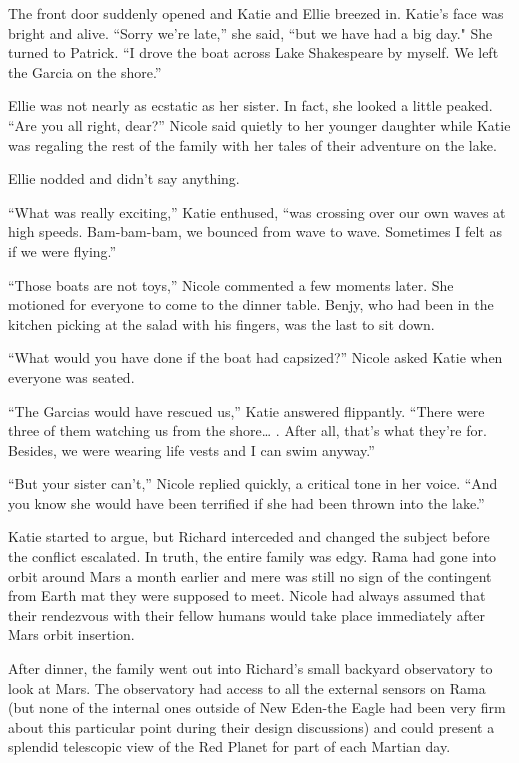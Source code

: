 \documentclass[]{article}
\begin{document}
{The front door suddenly opened and Katie and Ellie breezed in.  Katie’s face was bright and alive.  “Sorry we’re late,” she said, “but we have had a big day."  She turned to Patrick.  “I drove the boat across Lake Shakespeare by myself.  We left the Garcia on the shore.”

Ellie was not nearly as ecstatic as her sister.  In fact, she looked a little peaked.  “Are you all right, dear?” Nicole said quietly to her younger daughter while Katie was regaling the rest of the family with her tales of their adventure on the lake.

Ellie nodded and didn’t say anything.

“What was really exciting,” Katie enthused, “was crossing over our own waves at high speeds.  Bam-bam-bam, we bounced from wave to wave.  Sometimes I felt as if we were flying.”

“Those boats are not toys,” Nicole commented a few moments later.  She motioned for everyone to come to the dinner table.  Benjy, who had been in the kitchen picking at the salad with his fingers, was the last to sit down.

“What would you have done if the boat had capsized?” Nicole asked Katie when everyone was seated.

“The Garcias would have rescued us,” Katie answered flippantly.  “There were three of them watching us from the shore… .  After all, that’s what they’re for.  Besides, we were wearing life vests and I can swim anyway.”

“But your sister can’t,” Nicole replied quickly, a critical tone in her voice.  “And you know she would have been terrified if she had been thrown into the lake.”

Katie started to argue, but Richard interceded and changed the subject before the conflict escalated.  In truth, the entire family was edgy.  Rama had gone into orbit around Mars a month earlier and mere was still no sign of the contingent from Earth mat they were supposed to meet.  Nicole had always assumed that their rendezvous with their fellow humans would take place immediately after Mars orbit insertion.

After dinner, the family went out into Richard’s small backyard observatory to look at Mars.  The observatory had access to all the external sensors on Rama (but none of the internal ones outside of New Eden-the Eagle had been very firm about this particular point during their design discussions) and could present a splendid telescopic view of the Red Planet for part of each Martian day.

}
\end{document}
